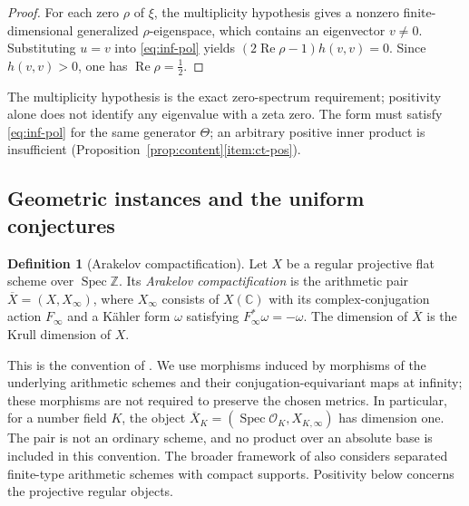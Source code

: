 \documentclass[11pt]{amsart}
\theoremstyle{plain}
\theoremstyle{definition}
\newtheorem{definition}[theorem]{Definition}
\theoremstyle{remark}
\numberwithin{equation}{section}
\newcommand{\C}{\mathbb{C}}
\newcommand{\Z}{\mathbb{Z}}
\newcommand{\Xbar}{\overline{X}}
\newcommand{\cO}{\mathcal{O}}
\DeclareMathOperator{\Spec}{Spec}
\DeclareMathOperator{\Rea}{Re}
\renewcommand{\Re}{\Rea}
\begin{document}
\begin{proof}
For each zero $\rho$ of $\xi$, the multiplicity hypothesis gives a
nonzero finite-dimensional generalized $\rho$-eigenspace, which
contains an eigenvector $v\ne0$. Substituting $u=v$ into
\eqref{eq:inf-pol} yields
$(2\Re\rho-1)h(v,v)=0$. Since $h(v,v)>0$, one has
$\Re\rho=\tfrac12$.
\end{proof}

The multiplicity hypothesis is the exact zero-spectrum requirement;
positivity alone does not identify any eigenvalue with a zeta zero.
The form must satisfy \eqref{eq:inf-pol} for the same generator
\(\Theta\); an arbitrary positive inner product is insufficient
(Proposition~\ref{prop:content}\ref{item:ct-pos}).

\subsection{Geometric instances and the uniform conjectures}
\label{subsec:uniform-instances}

\begin{definition}[Arakelov compactification]
\label{def:arakelov-pair}
Let $X$ be a regular projective flat scheme over $\Spec\Z$. Its
\emph{Arakelov compactification} is the arithmetic pair
$\Xbar=(X,X_\infty)$, where $X_\infty$ consists of $X(\C)$ with
its complex-conjugation action $F_\infty$ and a K\"ahler form
$\omega$ satisfying $F_\infty^*\omega=-\omega$.
The dimension of $\Xbar$ is the Krull dimension of $X$.
\end{definition}

This is the convention of
\cite[Notation~2.2, pp.~520--522]{FlachMorin2020DeningerWeilArakelov}.
We use morphisms induced by morphisms of the underlying arithmetic
schemes and their conjugation-equivariant maps at infinity; these
morphisms are not required to preserve the chosen metrics. In particular, for a number field
$K$, the object $\Xbar_K=(\Spec\cO_K,X_{K,\infty})$ has dimension one.
The pair is not an ordinary scheme, and no product over an absolute
base is included in this convention. The broader framework of
\cite[Conjecture~2.3, p.~522]{FlachMorin2020DeningerWeilArakelov}
also considers separated finite-type arithmetic schemes with compact
supports. Positivity below concerns the projective regular objects.
\end{document}
